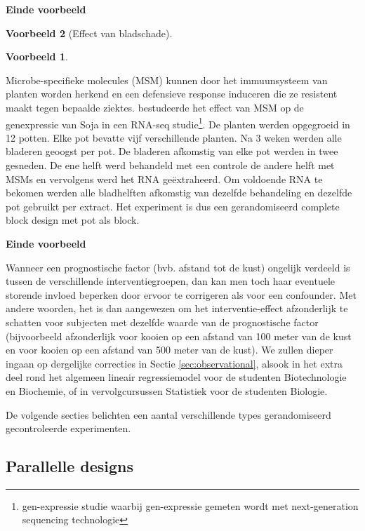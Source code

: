 \documentclass[
  12pt,dutch,coursenotes]{book}
\theoremstyle{definition}
\theoremstyle{definition}
\newtheorem{example}{Voorbeeld}[chapter]
\theoremstyle{definition}
\theoremstyle{remark}
\begin{document}
\textbf{Einde voorbeeld}

\begin{example}[Effect van bladschade]
\begin{example}

\protect\hypertarget{exm:unnamed-chunk-74}{}{\label{exm:unnamed-chunk-74} \iffalse (Effect van bladschade) \fi{} }

\end{example}
\end{example}

Microbe-specifieke molecules (MSM) kunnen door het immuunsysteem van planten worden herkend en een defensieve response induceren die ze resistent maakt tegen bepaalde ziektes. \citet{Valdes2014} bestudeerde het effect van MSM op de genexpressie van Soja in een RNA-seq studie\footnote{gen-expressie studie waarbij gen-expressie gemeten wordt met next-generation sequencing technologie}. De planten werden opgegroeid in 12 potten. Elke pot bevatte vijf verschillende planten. Na 3 weken werden alle bladeren geoogst per pot. De bladeren afkomstig van elke pot werden in twee gesneden. De ene helft werd behandeld met een controle de andere helft met MSMs en vervolgens werd het RNA geëxtraheerd. Om voldoende RNA te bekomen werden alle bladhelften afkomstig van dezelfde behandeling en dezelfde pot gebruikt per extract. Het experiment is dus een gerandomiseerd complete block design met pot als block.

\textbf{Einde voorbeeld}

Wanneer een prognostische factor (bvb. afstand tot de kust) ongelijk verdeeld is
tussen de verschillende interventiegroepen, dan kan men toch haar eventuele
storende invloed beperken door ervoor te corrigeren als voor een confounder.
Met andere woorden, het is dan aangewezen om het interventie-effect
afzonderlijk te schatten voor subjecten met dezelfde waarde van de
prognostische factor (bijvoorbeeld afzonderlijk voor kooien op een afstand van 100 meter van de kust en voor kooien op een afstand van 500 meter van de kust). We zullen dieper ingaan op dergelijke correcties
in Sectie \ref{sec:observational}, alsook in het extra deel rond het algemeen lineair regressiemodel voor de studenten Biotechnologie en Biochemie, of in vervolgcursussen Statistiek voor de studenten Biologie.

De volgende secties belichten een aantal verschillende types gerandomiseerd
gecontroleerde experimenten.

\hypertarget{parallelle-designs}{%
\subsection{Parallelle designs}\label{parallelle-designs}}
\end{document}
